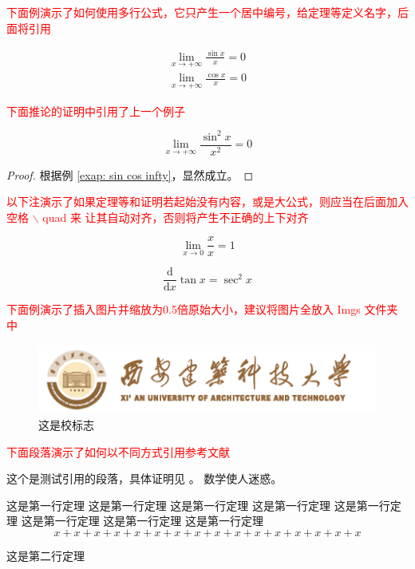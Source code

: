 \textcolor{red}{下面例演示了如何使用多行公式，它只产生一个居中编号，给定理等定义名字，后面将引用}
\begin{example}\label{exap: sin cos infty}
    \begin{equation}
        \begin{aligned}
            \lim_{x\to +\infty} \frac{\sin x}{x} = 0 \\
            \lim_{x\to +\infty} \frac{\cos x}{x} = 0
        \end{aligned}
    \end{equation}
\end{example}

\textcolor{red}{下面推论的证明中引用了上一个例子}
\begin{corollary}
    \[
        \lim_{x\to +\infty} \frac{\sin^2 x}{x^2} = 0
    \]

    \begin{proof}
        根据例 \ref{exap: sin cos infty}，显然成立。
    \end{proof}
\end{corollary}

\textcolor{red}{以下注演示了如果定理等和证明若起始没有内容，或是大公式，则应当在后面加入空格 $\backslash$ quad 来 让其自动对齐，否则将产生不正确的上下对齐}
\begin{remark} \quad
    \[
        \lim_{x\to 0} \frac{x}{x} = 1
    \]
\end{remark}

\begin{equation}
    \frac{\mathrm{d}}{\mathrm{d}x} \tan x = \sec^2 x
\end{equation}

\textcolor{red}{下面例演示了插入图片并缩放为0.5倍原始大小，建议将图片全放入 Imgs 文件夹中}

\begin{figure}[h]
    \centering %
    \includegraphics[scale=0.5]{Imgs/xiaoming.png}
    \caption{这是校标志}
\end{figure}

\textcolor{red}{下面段落演示了如何以不同方式引用参考文献}

这个是测试引用的段落\cite{Ibrahim2022}，具体证明见 \cite[定理 8]{SB2077}。
数学使人迷惑\supercite{SB2077}。

\begin{theorem}
    这是第一行定理
    这是第一行定理
    这是第一行定理
    这是第一行定理
    这是第一行定理
    这是第一行定理
    这是第一行定理
    这是第一行定理
    \[
        x + x + x + x +
        x + x + x + x +
        x + x + x + x +
        x + x + x + x
    \]
\end{theorem}

\begin{theorem}
    这是第二行定理
\end{theorem}


